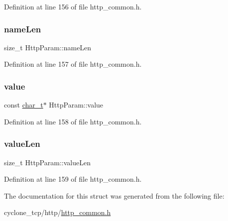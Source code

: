 Definition at line 156 of file http\+\_\+common.\+h.

\mbox{\label{structHttpParam_add2e147b2d6049958bce49266ea47aa0}} 
\subsubsection{\texorpdfstring{name\+Len}{nameLen}}
{\footnotesize\ttfamily size\+\_\+t Http\+Param\+::name\+Len}



Definition at line 157 of file http\+\_\+common.\+h.

\mbox{\label{structHttpParam_a5474d862a96866927a3a6880731e9af6}} 
\subsubsection{\texorpdfstring{value}{value}}
{\footnotesize\ttfamily const \hyperlink{compiler__port_8h_a40bb5262bf908c328fbcfbe5d29d0201}{char\+\_\+t}$\ast$ Http\+Param\+::value}



Definition at line 158 of file http\+\_\+common.\+h.

\mbox{\label{structHttpParam_abfd3afa2a5a13c642897c3ed8848db48}} 
\subsubsection{\texorpdfstring{value\+Len}{valueLen}}
{\footnotesize\ttfamily size\+\_\+t Http\+Param\+::value\+Len}



Definition at line 159 of file http\+\_\+common.\+h.



The documentation for this struct was generated from the following file\+:\begin{DoxyCompactItemize}
\item 
cyclone\+\_\+tcp/http/\hyperlink{http__common_8h}{http\+\_\+common.\+h}\end{DoxyCompactItemize}
